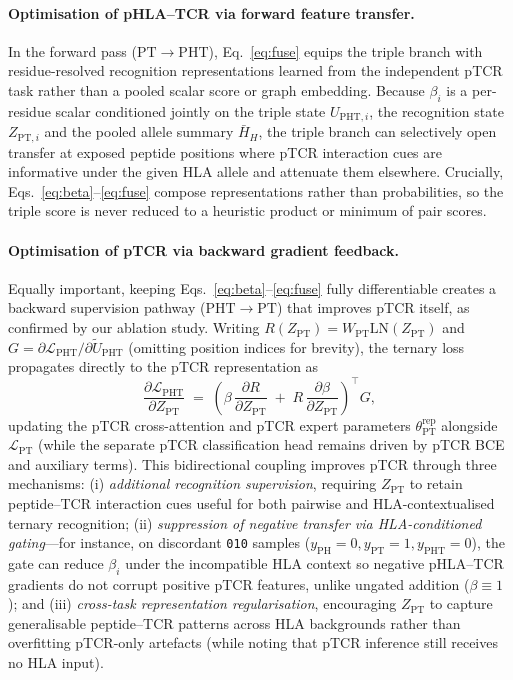 \documentclass[webpdf,modern,large,namedate]{oup-authoring-template}
\theoremstyle{thmstyleone}
\theoremstyle{thmstyletwo}
\theoremstyle{thmstylethree}
\newcommand{\PT}{pTCR}
\newcommand{\PHT}{pHLA--TCR}
\newcommand{\PHm}{\mathrm{PH}}
\newcommand{\PTm}{\mathrm{PT}}
\newcommand{\PHTm}{\mathrm{PHT}}
\newcommand{\LN}{\mathrm{LN}}
\begin{document}
\paragraph{Optimisation of \PHT{} via forward feature transfer.}
In the forward pass ($\PTm\rightarrow\PHTm$), Eq.~\eqref{eq:fuse} equips the
triple branch with residue-resolved recognition representations learned from
the independent \PT{} task rather than a pooled scalar score or graph
embedding. Because $\beta_i$ is a per-residue scalar conditioned jointly on the
triple state $U_{\PHTm,i}$, the recognition state $Z_{\PTm,i}$ and the pooled
allele summary $\bar H_H$, the triple branch can selectively open transfer at
exposed peptide positions where \PT{} interaction cues are informative under
the given HLA allele and attenuate them elsewhere. Crucially,
Eqs.~\eqref{eq:beta}--\eqref{eq:fuse} compose representations rather than
probabilities, so the triple score is never reduced to a heuristic product or
minimum of pair scores.

\paragraph{Optimisation of \PT{} via backward gradient feedback.}
Equally important, keeping Eqs.~\eqref{eq:beta}--\eqref{eq:fuse} fully
differentiable creates a backward supervision pathway ($\PHTm\rightarrow\PTm$)
that improves \PT{} itself, as confirmed by our ablation study. Writing
$R(Z_{\PTm})=W_{\PTm}\LN(Z_{\PTm})$ and
$G=\partial\mathcal{L}_{\PHTm}/\partial\tilde U_{\PHTm}$ (omitting position
indices for brevity), the ternary loss propagates directly to the \PT{}
representation as
\begin{equation}
\frac{\partial\mathcal{L}_{\PHTm}}{\partial Z_{\PTm}}\;=\;
\left(\beta\,\frac{\partial R}{\partial Z_{\PTm}}\;+\;
R\,\frac{\partial\beta}{\partial Z_{\PTm}}\right)^{\!\top} G,
\label{eq:pt-grad}
\end{equation}
updating the \PT{} cross-attention and \PT{} expert parameters
$\theta_{\PTm}^{\mathrm{rep}}$ alongside $\mathcal{L}_{\PTm}$ (while the
separate \PT{} classification head remains driven by \PT{} BCE and auxiliary
terms). This bidirectional coupling improves \PT{} through three mechanisms:
(i) \emph{additional recognition supervision}, requiring $Z_{\PTm}$ to retain
peptide--TCR interaction cues useful for both pairwise and HLA-contextualised
ternary recognition; (ii) \emph{suppression of negative transfer via
HLA-conditioned gating}---for instance, on discordant \texttt{010} samples
($y_{\PHm}=0, y_{\PTm}=1, y_{\PHTm}=0$), the gate can reduce $\beta_i$ under
the incompatible HLA context so negative \PHT{} gradients do not corrupt
positive \PT{} features, unlike ungated addition ($\beta\equiv1$); and
(iii) \emph{cross-task representation regularisation}, encouraging $Z_{\PTm}$ to
capture generalisable peptide--TCR patterns across HLA backgrounds rather than
overfitting \PT{}-only artefacts (while noting that \PT{} inference still
receives no HLA input).
\end{document}
